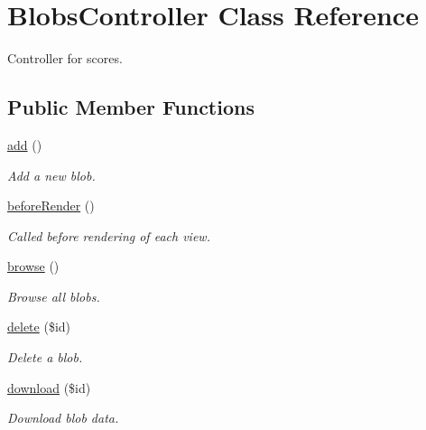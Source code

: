 \hypertarget{class_blobs_controller}{
\section{BlobsController Class Reference}
\label{class_blobs_controller}
}


Controller for scores.  


\subsection*{Public Member Functions}
\begin{DoxyCompactItemize}
\item 
\hyperlink{class_blobs_controller_a837ba24a1c3095ae67613238d866f79a}{add} ()
\begin{DoxyCompactList}\small\item\em Add a new blob. \item\end{DoxyCompactList}\item 
\hyperlink{class_blobs_controller_ac89dd29d2229bbc37879d31f95d06e97}{beforeRender} ()
\begin{DoxyCompactList}\small\item\em Called before rendering of each view. \item\end{DoxyCompactList}\item 
\hyperlink{class_blobs_controller_af41f268d662f2a4ffbe597d0580467a1}{browse} ()
\begin{DoxyCompactList}\small\item\em Browse all blobs. \item\end{DoxyCompactList}\item 
\hyperlink{class_blobs_controller_a2f8258add505482d7f00ea26493a5723}{delete} (\$id)
\begin{DoxyCompactList}\small\item\em Delete a blob. \item\end{DoxyCompactList}\item 
\hyperlink{class_blobs_controller_ad6a5f919a44257e2b5a5109cc6fc5fe2}{download} (\$id)
\begin{DoxyCompactList}\small\item\em Download blob data. \item\end{DoxyCompactList}\item 

\end{DoxyCompactItemize}
